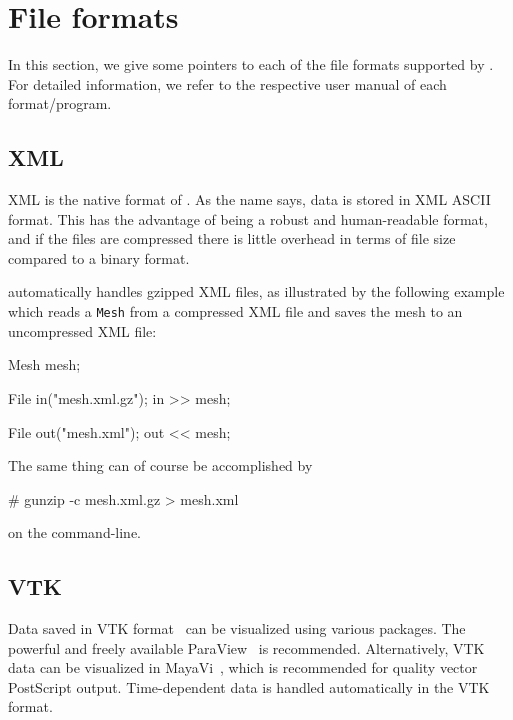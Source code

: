 \section{File formats}

In this section, we give some pointers to each of the file formats
supported by \dolfin{}. For detailed information, we refer to the
respective user manual of each format/program.


\subsection{\dolfin{} XML}

\dolfin{} XML is the native format of \dolfin{}. As the name says,
data is stored in XML ASCII format. This has the advantage of being a
robust and human-readable format, and if the files are compressed
there is little overhead in terms of file size compared to a binary
format.

\dolfin{} automatically handles gzipped XML files, as
illustrated by the following example which reads a \texttt{Mesh} from
a compressed \dolfin{} XML file and saves the mesh to an uncompressed
\dolfin{} XML file:
\begin{code}
Mesh mesh;

File in("mesh.xml.gz");
in >> mesh;

File out("mesh.xml");
out << mesh;
\end{code}
The same thing can of course be accomplished by
\begin{code}
# gunzip -c mesh.xml.gz > mesh.xml
\end{code}
on the command-line.

\subsection{VTK}

Data saved in VTK format~\cite{www:VTK} can be visualized using various
packages. The powerful and freely available ParaView~\cite{www:ParaView} 
is recommended. Alternatively, VTK data can be visualized in 
MayaVi~\cite{www:MayaVi}, which is recommended for quality vector PostScript 
output. Time-dependent data is handled automatically in the VTK format.

